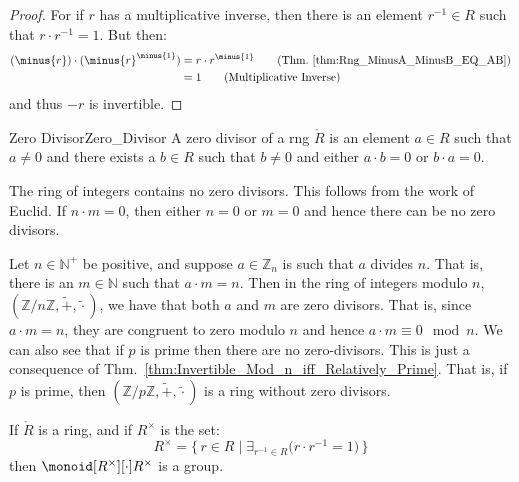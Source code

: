 \documentclass{article}                                                        %
\begin{document}
        \begin{proof}
            For if $r$ has a multiplicative inverse, then there is an
            element $r^{\minus{1}}\in{R}$ such that $r\cdot{r}^{\minus{1}}=1$.
            But then:
            \begin{align}
                (\minus{r})\cdot(\minus{r}^{\minus{1}})&=r\cdot{r}^{\minus{1}}
                    \tag{Thm.~\ref{thm:Rng_MinusA_MinusB_EQ_AB}}\\
                &=1\tag{Multiplicative Inverse}
            \end{align}
            and thus $\minus{r}$ is invertible.
        \end{proof}
        \begin{fdefinition}{Zero Divisor}{Zero_Divisor}
            A zero divisor of a rng $\ring{R}$ is an element $a\in{R}$ such that
            $a\ne{0}$ and there exists a $b\in{R}$ such that $b\ne{0}$ and
            either $a\cdot{b}=0$ or $b\cdot{a}=0$.
        \end{fdefinition}
        \begin{example}
            The ring of integers contains no zero divisors. This follows from
            the work of Euclid. If $n\cdot{m}=0$, then either $n=0$ or $m=0$ and
            hence there can be no zero divisors.
        \end{example}
        \begin{example}
            Let $n\in\mathbb{N}^{+}$ be positive, and suppose
            $a\in\mathbb{Z}_{n}$ is such that $a$ divides $n$. That is, there is
            an $m\in\mathbb{N}$ such that $a\cdot{m}=n$. Then in the ring of
            integers modulo $n$,
            $(\mathbb{Z}/n\mathbb{Z},\tilde{+},\tilde{\cdot})$, we have that
            both $a$ and $m$ are zero divisors. That is, since $a\cdot{m}=n$,
            they are congruent to zero modulo $n$ and hence
            $a\cdot{m}\equiv{0}\mod{n}$. We can also see that if $p$ is prime
            then there are no zero-divisors. This is just a consequence of
            Thm.~\ref{thm:Invertible_Mod_n_iff_Relatively_Prime}. That is, if
            $p$ is prime, then
            $(\mathbb{Z}/p\mathbb{Z},\tilde{+},\tilde{\cdot})$ is a ring without
            zero divisors.
        \end{example}
        \begin{theorem}
            \label{thm:Group_of_Units_of_Ring_is_Group}%
            If $\ring{R}$ is a ring, and if $R^{\times}$ is the set:
            \begin{equation}
                R^{\times}=\big\{\,r\in{R}\;|\;
                    \exists_{r^{\minus{1}}\in{R}}
                    \big(r\cdot{r}^{\minus{1}}=1\big)\,\big\}
            \end{equation}
            then $\monoid[R^{\times}][\cdot]{R^{\times}}$ is a group.
        \end{theorem}
\end{document}
